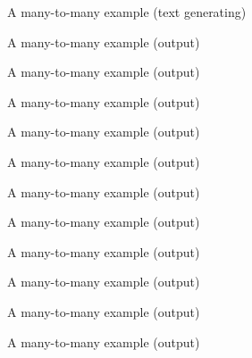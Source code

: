 \documentclass[10pt]{beamer}
\begin{document}
\begin{frame}{A many-to-many example (text generating)}
\lstI
\end{frame}



\begin{frame}{A many-to-many example (output)}

\end{frame}

\begin{frame}{A many-to-many example (output)}

\end{frame}

\begin{frame}{A many-to-many example (output)}

\end{frame}

\begin{frame}{A many-to-many example (output)}

\end{frame}

\begin{frame}{A many-to-many example (output)}

\end{frame}

\begin{frame}{A many-to-many example (output)}

\end{frame}

\begin{frame}{A many-to-many example (output)}

\end{frame}

\begin{frame}{A many-to-many example (output)}

\end{frame}

\begin{frame}{A many-to-many example (output)}

\end{frame}

\begin{frame}{A many-to-many example (output)}

\end{frame}

\begin{frame}{A many-to-many example (output)}

\end{frame}
\end{document}
